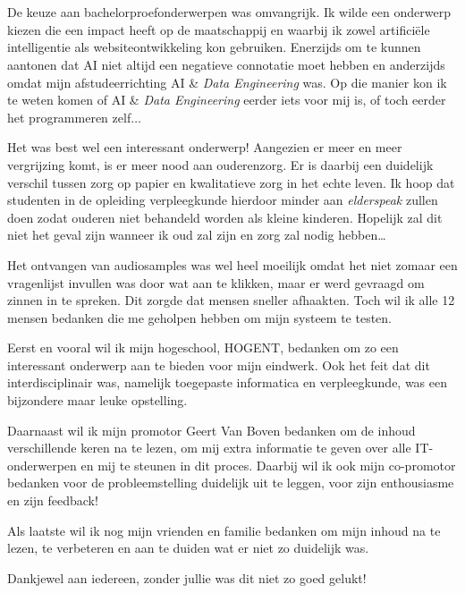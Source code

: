 
\chapter*{}
\label{ch:voorwoord}


De keuze aan bachelorproefonderwerpen was omvangrijk. Ik wilde een onderwerp kiezen die een impact heeft op de maatschappij en waarbij ik zowel artificiële intelligentie als websiteontwikkeling kon gebruiken. Enerzijds om te kunnen aantonen dat AI niet altijd een negatieve connotatie moet hebben en anderzijds omdat mijn afstudeerrichting AI \& \textit{Data Engineering} was. Op die manier kon ik te weten komen of AI \& \textit{Data Engineering} eerder iets voor mij is, of toch eerder het programmeren zelf$\ldots$

Het was best wel een interessant onderwerp! Aangezien er meer en meer vergrijzing komt, is er meer nood aan ouderenzorg. Er is daarbij een duidelijk verschil tussen zorg op papier en kwalitatieve zorg in het echte leven. Ik hoop dat studenten in de opleiding verpleegkunde hierdoor minder aan \textit{elderspeak} zullen doen zodat ouderen niet behandeld worden als kleine kinderen. Hopelijk zal dit niet het geval zijn wanneer ik oud zal zijn en zorg zal nodig hebben\ldots


Het ontvangen van audiosamples was wel heel moeilijk omdat het niet zomaar een vragenlijst invullen was door wat aan te klikken, maar er werd gevraagd om zinnen in te spreken. Dit zorgde dat mensen sneller afhaakten. Toch wil ik alle 12 %
mensen bedanken die me geholpen hebben om mijn systeem te testen.

Eerst en vooral wil ik mijn hogeschool, HOGENT, bedanken om zo een interessant onderwerp aan te bieden voor mijn eindwerk. Ook het feit dat dit interdisciplinair was, namelijk toegepaste informatica en verpleegkunde, was een bijzondere maar leuke opstelling.

Daarnaast wil ik mijn promotor Geert Van Boven bedanken om de inhoud verschillende keren na te lezen, om mij extra informatie te geven over alle IT-onderwerpen en mij te steunen in dit proces.
Daarbij wil ik ook mijn co-promotor bedanken voor de probleemstelling duidelijk uit te leggen, voor zijn enthousiasme en zijn feedback!

Als laatste wil ik nog mijn vrienden en familie bedanken om mijn inhoud na te lezen, te verbeteren en aan te duiden wat er niet zo duidelijk was.

Dankjewel aan iedereen, zonder jullie was dit niet zo goed gelukt!
